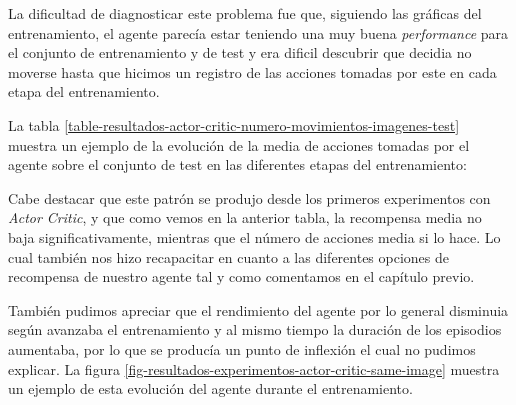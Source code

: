 La dificultad de diagnosticar este problema fue que, siguiendo las gráficas del entrenamiento, el agente parecía estar teniendo una muy buena \textit{performance} para el conjunto de entrenamiento y de test y era dificil descubrir que decidia no moverse hasta que hicimos un registro de las acciones tomadas por este en cada etapa del entrenamiento.
\medskip



La tabla \ref{table-resultados-actor-critic-numero-movimientos-imagenes-test} muestra un ejemplo de la evolución de la media de acciones tomadas por el agente sobre el conjunto de test en las diferentes etapas del entrenamiento:
\medskip

Cabe destacar que este patrón se produjo desde los primeros experimentos con \textit{Actor Critic}, y que como vemos en la anterior tabla, la recompensa media no baja significativamente, mientras que el número de acciones media si lo hace. Lo cual también nos hizo recapacitar en cuanto a las diferentes opciones de recompensa de nuestro agente tal y como comentamos en el capítulo previo.
\medskip

También pudimos apreciar que el rendimiento del agente por lo general disminuia según avanzaba el entrenamiento y al mismo tiempo la duración de los episodios aumentaba, por lo que se producía un punto de inflexión el cual no pudimos explicar. La figura \ref{fig-resultados-experimentos-actor-critic-same-image} muestra un ejemplo de esta evolución del agente durante el entrenamiento.
\medskip


